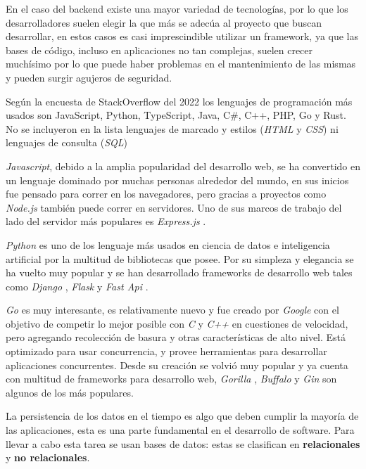 En el caso del backend existe una mayor variedad de tecnologías, por lo que los desarrolladores suelen elegir la que más se adecúa al proyecto que buscan desarrollar, en estos casos es casi imprescindible utilizar un framework, ya que las bases de código, incluso en aplicaciones no tan complejas, suelen crecer muchísimo por lo que puede haber problemas en el mantenimiento de las mismas y pueden surgir agujeros de seguridad.
\newline

Según la encuesta de StackOverflow del 2022 \cite{encuesta2022} los lenguajes de programación más usados son
	 JavaScript,
	 Python,
	 TypeScript,
	 Java,
	 C\#,
	 C++,
	 PHP,
	 Go y
	 Rust.
No se incluyeron en la lista lenguajes de marcado y estilos (\textit{HTML} y \textit{CSS}) ni lenguajes de consulta (\textit{SQL})
\newline

\textit{Javascript}, debido a la amplia popularidad del desarrollo web, se ha convertido en un lenguaje dominado por muchas personas alrededor del mundo, en sus inicios fue pensado para correr en los navegadores, pero gracias a proyectos como \textit{Node.js} \cite{node} también puede correr en servidores. Uno de sus marcos de trabajo del lado del servidor más populares  es \textit{Express.js} \cite{express}.
\newline

\textit{Python} es uno de los lenguaje más usados en ciencia de datos e inteligencia artificial por la multitud de bibliotecas que posee. Por su simpleza y elegancia se ha vuelto muy popular y se han desarrollado frameworks de desarrollo web tales como \textit{Django} \cite{django}, \textit{Flask} \cite{flask} y \textit{Fast Api} \cite{fastapi}.
\newline

\textit{Go} \cite{golang} es muy interesante, es relativamente nuevo y fue creado por \textit{Google} con el objetivo de competir lo mejor posible con \textit{C} y \textit{C++} en cuestiones de velocidad, pero agregando recolección de basura y otras características de alto nivel. Está optimizado para usar concurrencia, y provee herramientas para desarrollar aplicaciones concurrentes. Desde su creación se volvió muy popular y ya cuenta con multitud de frameworks para desarrollo web, \textit{Gorilla} \cite{gorilla}, \textit{Buffalo} \cite{buffalo} y \textit{Gin} \cite{gin} son algunos de los más populares.
\newline

La persistencia de los datos en el tiempo es algo que deben cumplir la mayoría de las aplicaciones, esta es una parte fundamental en el desarrollo de software. Para llevar a cabo esta tarea se usan bases de datos: estas se clasifican en \textbf{relacionales} y \textbf{no relacionales}.
\newline

